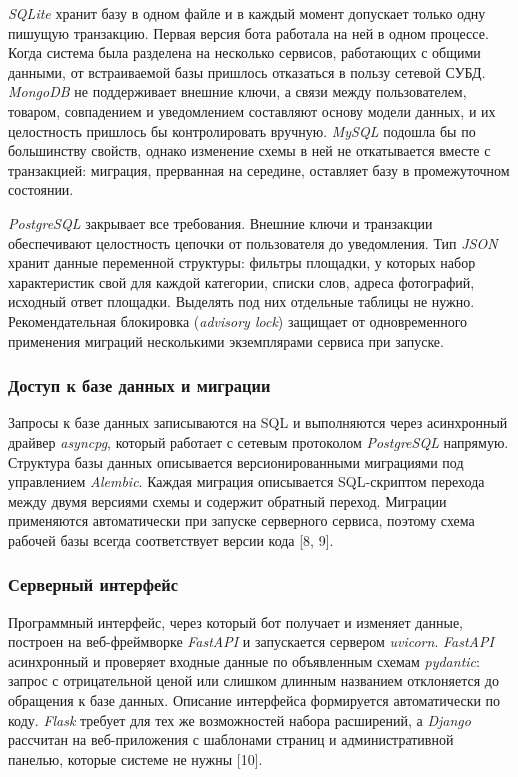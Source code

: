 \textit{SQLite} хранит базу в одном файле и в каждый момент допускает только одну пишущую транзакцию. Первая версия бота работала на ней в одном процессе. Когда система была разделена на несколько сервисов, работающих с общими данными, от встраиваемой базы пришлось отказаться в пользу сетевой СУБД. \textit{MongoDB} не поддерживает внешние ключи, а связи между пользователем, товаром, совпадением и уведомлением составляют основу модели данных, и их целостность пришлось бы контролировать вручную. \textit{MySQL} подошла бы по большинству свойств, однако изменение схемы в ней не откатывается вместе с транзакцией: миграция, прерванная на середине, оставляет базу в промежуточном состоянии.

\textit{PostgreSQL} закрывает все требования. Внешние ключи и транзакции обеспечивают целостность цепочки от пользователя до уведомления. Тип \textit{JSON} хранит данные переменной структуры: фильтры площадки, у которых набор характеристик свой для каждой категории, списки слов, адреса фотографий, исходный ответ площадки. Выделять под них отдельные таблицы не нужно. Рекомендательная блокировка (\textit{advisory lock}) защищает от одновременного применения миграций несколькими экземплярами сервиса при запуске.

\subsubsection{Доступ к базе данных и миграции}

Запросы к базе данных записываются на SQL и выполняются через асинхронный драйвер \textit{asyncpg}, который работает с сетевым протоколом \textit{PostgreSQL} напрямую. Структура базы данных описывается версионированными миграциями под управлением \textit{Alembic}. Каждая миграция описывается SQL-скриптом перехода между двумя версиями схемы и содержит обратный переход. Миграции применяются автоматически при запуске серверного сервиса, поэтому схема рабочей базы всегда соответствует версии кода [8, 9].

\subsubsection{Серверный интерфейс}

Программный интерфейс, через который бот получает и изменяет данные, построен на веб-фреймворке \textit{FastAPI} и запускается сервером \textit{uvicorn}. \textit{FastAPI} асинхронный и проверяет входные данные по объявленным схемам \textit{pydantic}: запрос с отрицательной ценой или слишком длинным названием отклоняется до обращения к базе данных. Описание интерфейса формируется автоматически по коду. \textit{Flask} требует для тех же возможностей набора расширений, а \textit{Django} рассчитан на веб-приложения с шаблонами страниц и административной панелью, которые системе не нужны [10].

